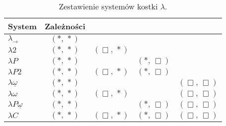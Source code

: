 \begin{table}[H]
  \begin{center}
    \begin{tabular}{l | c c c c}
    System & Zależności \\
    \hline 
    \(\lambda_{\to}\)                 & \((*,\,*)\) \\
    \(\lambda 2\)                     & \((*,\,*)\) & \((\Box,\,*)\) \\
    \(\lambda P\)                     & \((*,\,*)\) & & \((*,\,\Box)\) \\
    \(\lambda P2\)                    & \((*,\,*)\) & \((\Box,\,*)\) & \((*,\,\Box)\) \\
    \(\lambda \underline{\omega}\)    & \((*,\,*)\) & & & \((\Box,\,\Box)\)\\
    \(\lambda \omega\)                & \((*,\,*)\) & \((\Box,\,*)\) & & \((\Box,\,\Box)\)\\
    \(\lambda P\underline{\omega}\)   & \((*,\,*)\) & & \((*,\,\Box)\) & \((\Box,\,\Box)\) \\
    \(\lambda C\)                     & \((*,\,*)\) & \((\Box,\,*)\) & \((*,\,\Box)\) & \((\Box,\,\Box)\) \\
  \end{tabular}\\
  \end{center}
  \caption{Zestawienie systemów kostki \(\lambda\).} \label{tab:lambda-cube}
\end{table}
